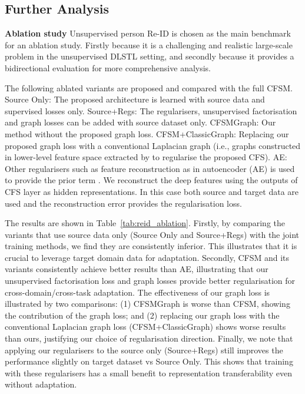 \documentclass[letterpaper]{article} \usepackage{aaai19}  \usepackage{times}  \usepackage{helvet}  \usepackage{courier}  \usepackage{url}  \usepackage{graphicx}
\newcommand{\keypoint}[1]{\noindent\textbf{#1}\quad}
\begin{document}
\subsection{Further Analysis}
\keypoint{Ablation study}  Unsupervised person Re-ID is chosen as the main benchmark for an ablation study. Firstly because it is a challenging and realistic large-scale problem in the unsupervised DLSTL setting, and secondly because it provides a bidirectional evaluation for more comprehensive analysis.


The following ablated variants are proposed and compared with the full CFSM. Source Only: The proposed architecture is learned with source data and supervised losses only. Source+Regs: The regularisers, unsupervised factorisation and graph losses can be added with source dataset only. CFSMGraph: Our method without the proposed graph loss. CFSM+ClassicGraph: Replacing our proposed graph loss with a conventional Laplacian graph (i.e., graphs constructed in lower-level feature space extracted by  to regularise the proposed CFS). AE: Other regularisers such as feature reconstruction as in autoencoder (AE) is used to provide the prior term . We reconstruct the deep features   using the outputs of CFS layer as hidden representations. In this case both source and target data are used and the reconstruction error provides the regularisation loss. 

The results are shown in Table~\ref{tab:reid_ablation}. Firstly, by comparing the variants that use source data only (Source Only and Source+Regs) with the joint training methods, we find they are consistently inferior. This illustrates that it is crucial to leverage target domain data for adaptation. 
Secondly, CFSM and its variants consistently achieve better results than AE, illustrating that our unsupervised factorisation loss and graph losses provide better regularisation for cross-domain/cross-task adaptation. The effectiveness of our graph loss is illustrated by two comparisons: (1) CFSMGraph is worse than CFSM, showing the contribution of the graph loss; and (2) replacing our graph loss with the conventional Laplacian graph loss (CFSM+ClassicGraph) shows worse results than ours, justifying our choice of regularisation direction.
Finally, we note that applying our regularisers to the source only (Source+Regs) still improves the performance slightly on target dataset vs Source Only. This shows that training with these regularisers has a small benefit to representation transferability even without adaptation.
\end{document}
